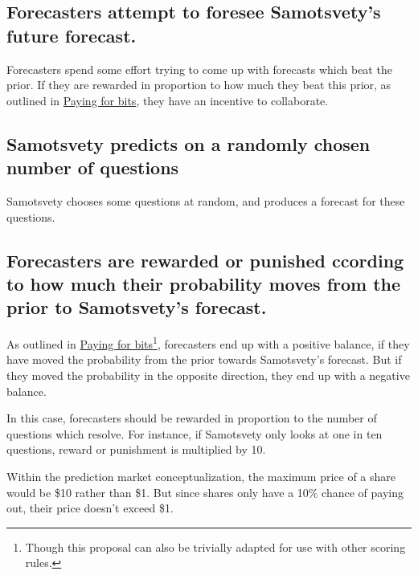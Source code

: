 \documentclass[]{article}
\begin{document}
\hypertarget{forecasters-attempt-to-foresee-samotsvetys-future-forecast.}{%
\subsection{Forecasters attempt to foresee Samotsvety's future
forecast.}\label{forecasters-attempt-to-foresee-samotsvetys-future-forecast.}}

Forecasters spend some effort trying to come up with forecasts which
beat the prior. If they are rewarded in proportion to how much they beat
this prior, as outlined in \href{}{Paying for bits}, they have an
incentive to collaborate.

\hypertarget{samotsvety-predicts-on-a-randomly-chosen-number-of-questions}{%
\subsection{Samotsvety predicts on a randomly chosen number of
questions}\label{samotsvety-predicts-on-a-randomly-chosen-number-of-questions}}

Samotsvety chooses some questions at random, and produces a forecast for
these questions.

\hypertarget{forecasters-are-rewarded-or-punished-ccording-to-how-much-their-probability-moves-from-the-prior-to-samotsvetys-forecast.}{%
\subsection{Forecasters are rewarded or punished ccording to how much
their probability moves from the prior to Samotsvety's
forecast.}\label{forecasters-are-rewarded-or-punished-ccording-to-how-much-their-probability-moves-from-the-prior-to-samotsvetys-forecast.}}

As outlined in \href{}{Paying for bits}\footnote{Though this proposal
  can also be trivially adapted for use with other scoring rules.},
forecasters end up with a positive balance, if they have moved the
probability from the prior towards Samotsvety's forecast. But if they
moved the probability in the opposite direction, they end up with a
negative balance.

In this case, forecasters should be rewarded in proportion to the number
of questions which resolve. For instance, if Samotsvety only looks at
one in ten questions, reward or punishment is multiplied by 10.

Within the prediction market conceptualization, the maximum price of a
share would be \$10 rather than \$1. But since shares only have a 10\%
chance of paying out, their price doesn't exceed \$1.
\end{document}
